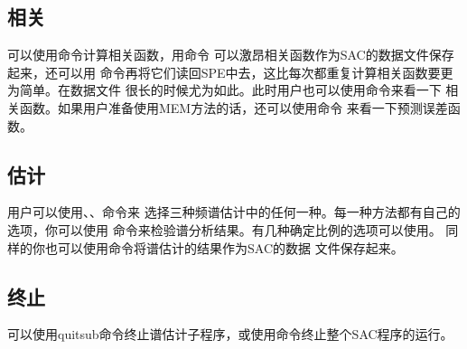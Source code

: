 \subsection{相关}
可以使用命令计算相关函数，用命令
可以激昂相关函数作为SAC的数据文件保存起来，还可以用
命令再将它们读回SPE中去，这比每次都重复计算相关函数要更为简单。在数据文件
很长的时候尤为如此。此时用户也可以使用命令来看一下
相关函数。如果用户准备使用MEM方法的话，还可以使用命令
来看一下预测误差函数。

\subsection{估计}
用户可以使用、、命令来
选择三种频谱估计中的任何一种。每一种方法都有自己的选项，你可以使用
命令来检验谱分析结果。有几种确定比例的选项可以使用。
同样的你也可以使用命令将谱估计的结果作为SAC的数据
文件保存起来。

\subsection{终止}
可以使用quitsub命令终止谱估计子程序，或使用命令终止整个SAC程序的运行。
